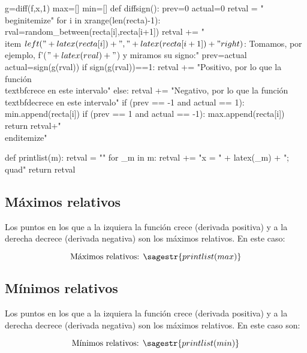 \documentclass[nochap,palatino]{apuntes}
\begin{document}
\begin{problem}
\begin{sagesilent}
g=diff(f,x,1)
max=[]
min=[]
def diffsign():
    prev=0
    actual=0
    retval = "\\begin{itemize}"
    for i in xrange(len(recta)-1):
        rval=random_between(recta[i],recta[i+1])
        retval += "\\item $\\left("+latex(recta[i])+","+latex(recta[i+1])+"\\right)$: Tomamos, por ejemplo, f'($"+latex(rval)+"$) y miramos su signo:" 
        prev=actual
        actual=sign(g(rval))
        if sign(g(rval))==1: 
            retval += "Positivo, por lo que la función \\textbf{crece} en este intervalo"  
        else:
            retval += "Negativo, por lo que la función \\textbf{decrece} en este intervalo"
        if (prev == -1 and actual == 1):
            min.append(recta[i])
        if (prev == 1 and actual == -1):
            max.append(recta[i])
    return retval+"\\end{itemize}"

def printlist(m):
    retval = ""
    for _m in m:
    	retval += "x = " + latex(_m) + ";\\quad"
    return retval

\end{sagesilent}


\subsection{Máximos relativos}
Los puntos en los que a la izquiera la función crece (derivada positiva) y a la derecha decrece (derivada negativa) son los máximos relativos. En este caso: 

\[\text{Máximos relativos: } \sagestr{printlist(max)}\]

\subsection{Mínimos relativos}
Los puntos en los que a la izquiera la función crece (derivada positiva) y a la derecha decrece (derivada negativa) son los máximos relativos. En este caso son: 

\[\text{Mínimos relativos: }\sagestr{printlist(min)}\]

\end{problem}
\end{document}
